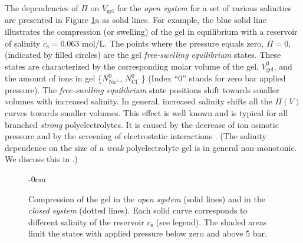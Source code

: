 \documentclass[gels,article,accept,pdftex,moreauthors]{Definitions/mdpi}
\newcommand{\Nna}{N_\mathrm{Na^+}}
\newcommand{\Ncl}{N_\mathrm{Cl^-}}
\newcommand{\cs}{c_{\mathrm{s}}}
\newcommand{\Vgel}{V_\mathrm{gel}}
\newcommand{\Pgel}{\Pi}
\begin{document}
The dependencies of $\Pgel$ on $\Vgel$ for the \emph{open system} for a set of various salinities are presented
in Figure \ref{fig: PV and CV}a as solid lines. 
For example, the blue solid line illustrates the compression (or swelling) of the gel in equilibrium with a reservoir of salinity $\cs=0.063$ mol/L. 
The points where the pressure equals zero, $\Pgel=0$, (indicated by filled circles) are the gel \emph{free-swelling equilibrium} states.
These states are characterized by the corresponding molar volume of the gel, $\Vgel^0$, and the amount of ions in gel \{$\Nna^0$, $\Ncl^0$\} 
(Index ``0'' stands for zero bar applied pressure).
The \emph{free-swelling equilibrium} state positions shift towards smaller volumes with increased salinity. 
In general, increased salinity shifts all the $\Pgel(V)$ curves towards smaller volumes.
This effect is well known and is typical for all branched \emph{strong} polyelectrolytes. 
It is caused by the decrease of ion osmotic pressure and by the screening of electrostatic interactions \cite{Zhulina2000, Landsgesel2020a}.
(The salinity dependence on the size of a \emph{weak} polyelectrolyte gel is in general non-monotonic. We discuss this in \cite{Rud2018}.)
\begin{figure}[H]
	\begin{adjustwidth}{-\extralength}{0cm}
	\centering
	{\captionsetup{position=bottom,justification=centering}
	\hspace{0.02\textwidth}
		}\end{adjustwidth}
	\caption{
	Compression of the gel in the \emph{open system} (solid lines) and in the \emph{closed system} (dotted lines). 
	Each solid curve corresponds to different salinity of the reservoir $\cs$ (see legend).
	The shaded areas limit the states with applied pressure below zero and above 5 bar.\label{fig: PV and CV}}

\end{figure}
\end{document}
